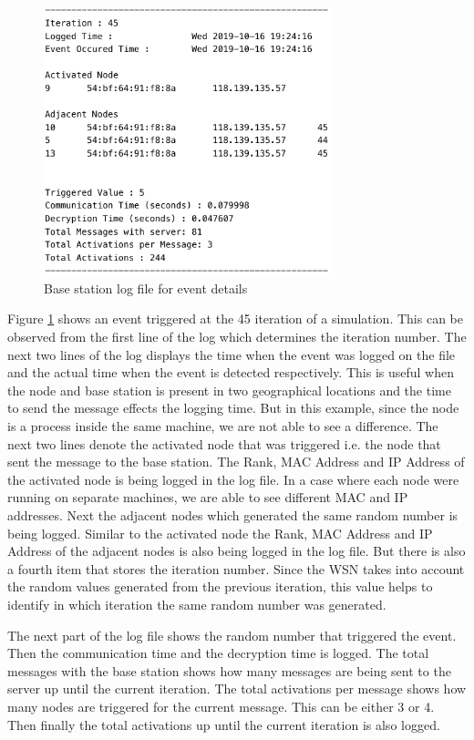 \documentclass[conference]{IEEEtran}
\begin{document}
	\begin{figure}[!h]
		\centering
		\includegraphics[width=3.3in,keepaspectratio]{logE}
		\caption{Base station log file for event details}
		\label{lst:log1}
	\end{figure}	
	Figure \ref{lst:log1} shows an event triggered at the 45 iteration of a simulation. This can be observed from the first line of the log which determines the iteration number. The next two lines of the log displays the time when the event was logged on the file and the actual time when the event is detected respectively. This is useful when the node and base station is present in two geographical locations and the time to send the message effects the logging time. But in this example, since the node is a process inside the same machine, we are not able to see a difference. The next two lines denote the activated node that was triggered i.e. the node that sent the message to the base station. The Rank, MAC Address and IP Address of the activated node is being logged in the log file. In a case where each node were running on separate machines, we are able to see different MAC and IP addresses. Next the adjacent nodes which generated the same random number is being logged. Similar to the activated node the Rank, MAC Address and IP Address of the adjacent nodes is also being logged in the log file. But there is also a fourth item that stores the iteration number. Since the WSN takes into account the random values generated from the previous iteration, this value helps to identify in which iteration the same random number was generated.
	
	The next part of the log file shows the random number that triggered the event. Then the communication time and the decryption time is logged. The total messages with the base station shows how many messages are being sent to the server up until the current iteration. The total activations per message shows how many nodes are triggered for the current message. This can be either 3 or 4. Then finally the total activations up until the current iteration is also logged.
	
\end{document}
